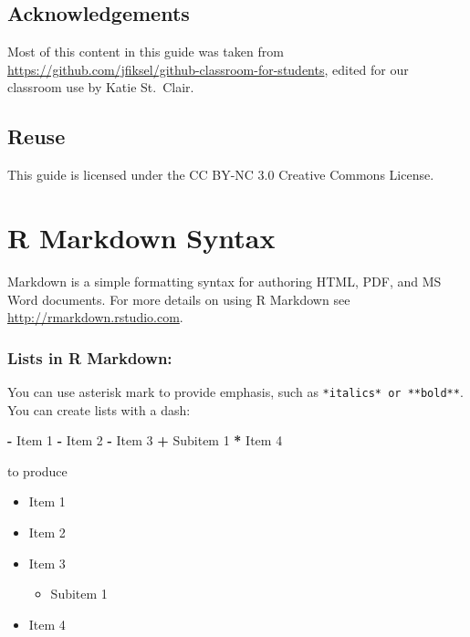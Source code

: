 \documentclass[
]{book}
\newenvironment{Shaded}{\begin{snugshade}}{\end{snugshade}}
\newcommand{\DecValTok}[1]{\textcolor[rgb]{0.00,0.00,0.81}{#1}}
\newcommand{\NormalTok}[1]{#1}
\newcommand{\SpecialCharTok}[1]{\textcolor[rgb]{0.81,0.36,0.00}{\textbf{#1}}}
\providecommand{\tightlist}{%
  \setlength{\itemsep}{0pt}\setlength{\parskip}{0pt}}
\begin{document}
\hypertarget{acknowledgements-1}{%
\section{Acknowledgements}\label{acknowledgements-1}}

Most of this content in this guide was taken from
\url{https://github.com/jfiksel/github-classroom-for-students}, edited for our classroom use by Katie St.~Clair.

\hypertarget{reuse}{%
\section{Reuse}\label{reuse}}

This guide is licensed under the CC BY-NC 3.0 Creative
Commons License.

\hypertarget{r-markdown-syntax}{%
\chapter{R Markdown Syntax}\label{r-markdown-syntax}}

Markdown is a simple formatting syntax for authoring HTML, PDF, and MS Word documents. For more details on using R Markdown see \url{http://rmarkdown.rstudio.com}.

\hypertarget{lists-in-r-markdown}{%
\subsection{Lists in R Markdown:}\label{lists-in-r-markdown}}

You can use asterisk mark to provide emphasis, such as \texttt{*italics*\ or\ **bold**}. You can create lists with a dash:

\begin{Shaded}
\begin{Highlighting}[]
\SpecialCharTok{{-}}\NormalTok{ Item }\DecValTok{1}
\SpecialCharTok{{-}}\NormalTok{ Item }\DecValTok{2}
\SpecialCharTok{{-}}\NormalTok{ Item }\DecValTok{3}
  \SpecialCharTok{+}\NormalTok{ Subitem }\DecValTok{1}
\SpecialCharTok{*}\NormalTok{ Item }\DecValTok{4}
\end{Highlighting}
\end{Shaded}

to produce

\begin{itemize}
\tightlist
\item
  Item 1
\item
  Item 2
\item
  Item 3

  \begin{itemize}
  \tightlist
  \item
    Subitem 1
  \end{itemize}
\item
  Item 4
\end{itemize}
\end{document}
